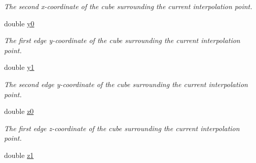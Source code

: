 \begin{DoxyCompactItemize}
\begin{DoxyCompactList}\small\item\em The second x-\/coordinate of the cube surrounding the current interpolation point. \item\end{DoxyCompactList}\item 
\hypertarget{classassignment_1_1_interpolator3_d_a42b29917bd0265791560f4ddc697f7ea}{
double \hyperlink{classassignment_1_1_interpolator3_d_a42b29917bd0265791560f4ddc697f7ea}{y0}}
\label{classassignment_1_1_interpolator3_d_a42b29917bd0265791560f4ddc697f7ea}

\begin{DoxyCompactList}\small\item\em The first edge y-\/coordinate of the cube surrounding the current interpolation point. \item\end{DoxyCompactList}\item 
\hypertarget{classassignment_1_1_interpolator3_d_ad5cd282be05bb14625807880ed3fc322}{
double \hyperlink{classassignment_1_1_interpolator3_d_ad5cd282be05bb14625807880ed3fc322}{y1}}
\label{classassignment_1_1_interpolator3_d_ad5cd282be05bb14625807880ed3fc322}

\begin{DoxyCompactList}\small\item\em The second edge y-\/coordinate of the cube surrounding the current interpolation point. \item\end{DoxyCompactList}\item 
\hypertarget{classassignment_1_1_interpolator3_d_a9a1fcc6b430714b7171ff2e41a8ced79}{
double \hyperlink{classassignment_1_1_interpolator3_d_a9a1fcc6b430714b7171ff2e41a8ced79}{z0}}
\label{classassignment_1_1_interpolator3_d_a9a1fcc6b430714b7171ff2e41a8ced79}

\begin{DoxyCompactList}\small\item\em The first edge z-\/coordinate of the cube surrounding the current interpolation point. \item\end{DoxyCompactList}\item 
\hypertarget{classassignment_1_1_interpolator3_d_a98c11cc781d0338f6049e186011988b3}{
double \hyperlink{classassignment_1_1_interpolator3_d_a98c11cc781d0338f6049e186011988b3}{z1}}
\label{classassignment_1_1_interpolator3_d_a98c11cc781d0338f6049e186011988b3}


\end{DoxyCompactItemize}
